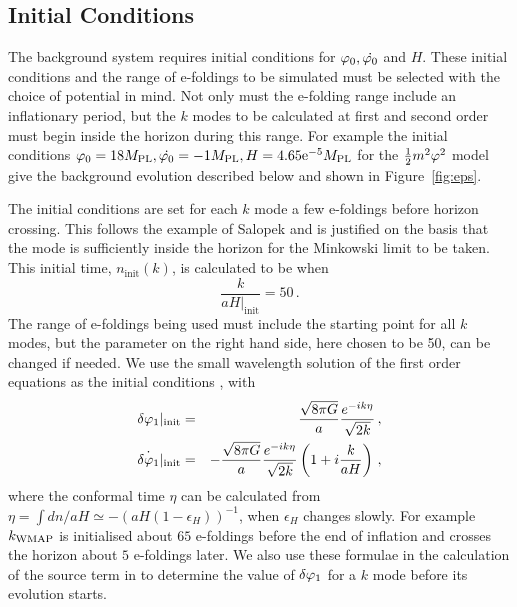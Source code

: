 \subsection{Initial Conditions} 
\label{sec:initconds-num}

The background system requires initial conditions for $\varphi_{0},
\dot{\varphi_{0}}$ and $H$. These initial conditions and the range of
e-foldings to be simulated must be selected with the choice of
potential in mind. Not only must the
e-folding range include an inflationary period, but the $k$ modes to
be calculated at first and second order must begin inside the horizon
during this range. For example the initial conditions $\varphi_0 = 18M_{\mathrm{PL}},
\dot{\varphi_0} = -1 M_{\mathrm{PL}}, H = 4.65\mathrm{e}^{{-5}}M_{\mathrm{PL}}$ for the $\frac{1}{2} m^2 \varphi^2$ model 
give the background evolution described below and shown in Figure~\ref{fig:eps}.


The initial conditions are set for each $k$ mode a few e-foldings
before horizon crossing. This follows the example of Salopek
\etal
\cite{Salopek:1988qh} and is justified on the basis that the mode is
sufficiently inside the
horizon for the Minkowski limit to be taken. This initial time,
$n_{\mathrm{init}}(k)$, is calculated to be when
%  
\begin{equation}
 \frac{k}{aH|_{\mathrm{init}}} = 50 \,.
\end{equation}
%
The range of e-foldings being used must include the starting point for
all $k$ modes, but the parameter on the right hand side, here chosen to
be 50, can be changed if needed.  We use the small wavelength solution
of the first order equations as the initial conditions \cite{Salopek:1988qh}, with
%
\begin{eqnarray}
\label{eq:foics}
 \delta\varphi_{1}|_{\mathrm{init}} &=& \frac{\sqrt{8\pi G}}{a}
\frac{e^{-i k\eta}}{\sqrt{2k}} \,,\\
 \dot{\delta\varphi_{1}}|_{\mathrm{init}} &=& -\frac{\sqrt{8\pi G}}{a}
\frac{e^{-i k\eta}}{\sqrt{2k}} \left(1 + i \frac{k}{a H}\right) \,,
\end{eqnarray}
%
where the conformal time $\eta$ can be calculated from $\eta=\int dn/aH \simeq
-(aH(1-\epsilon_H))^{-1}$, when $\epsilon_H$ changes slowly. For example $k_\mathrm{WMAP}$ is initialised
about $65$ e-foldings before the end of inflation and crosses the horizon about $5$ e-foldings
later.
We also use these formulae in the calculation of the source term in  to
determine the value of $\delta\varphi_{1}$ for a $k$ mode before its evolution starts.


